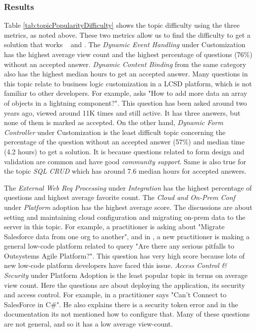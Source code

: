 \subsubsection{Results}
Table \ref{tab:topicPopularityDifficulty} shows the topic difficulty using the three metrics, as noted above. 
These two metrics allow us to find the difficulty to get a solution that works ~\cite{bagherzadeh2019going} and \cite{abdellatif2020challenges}. 
The \textit{Dynamic Event Handling} under Customization has the highest average view count and the highest percentage of questions (76\%) without an accepted answer. \textit{Dynamic Content Binding} from the same category also has the highest median hours to get an accepted answer. Many questions in this topic relate to business logic customization in a LCSD platform, which is not familiar to other developers. For example,  asks "How to add more data an array of objects in a lightning component?". This question has been asked around two years ago, viewed around 11K times and still active. It has three answers, but none of them is marked as accepted. On the other hand, \textit{Dynamic Form Controller} under Customization is the least difficult topic concerning the percentage of the question without an accepted answer (57\%) and median time (4.2 hours) to get a solution. It is because questions related to form design and validation are common and have good \textit{community support}. Same is also true for the topic \textit{SQL CRUD} which has around 7.6 median hours for accepted answers.

The \textit{External Web Req Processing} under
 \textit{Integration} has the highest percentage of questions and highest average
favorite count. The \textit{Cloud and On-Prem Conf}
under  \textit{Platform} adoption has the highest average score. The
discussions are about setting and maintaining cloud configuration and migrating
on-prem data to the server in this topic. For example,  a practitioner is asking
about  "Migrate Salesforce data from one org to another", and in , a
new practitioner is making a general low-code platform related to query "Are
there any serious pitfalls to Outsystems Agile Platform?". This question has
very high score because lots of new low-code platform developers have faced this
issue. \textit{Access Control \& Security} under Platform Adoption is the least
popular topic in terms on average view count. Here the questions are about
deploying the application, its security and access control. For example, in
 a practitioner says "Can't Connect to SalesForce in C\#". He also
explains there is a security token error and in the documentation its not
mentioned how to configure that. Many of these questions are not general, and
so it has a low average view-count.

